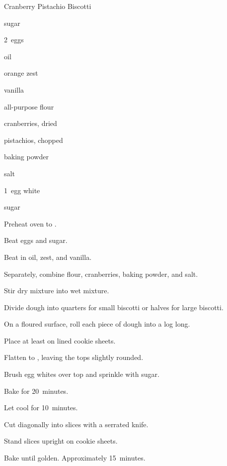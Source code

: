 \begin{recipe}{Cranberry Pistachio Biscotti}{}{}

\begin{ingredients}
\item \C{\threequarter} sugar
\item 2~eggs
\item \C{\quarter} oil
\item \tp{1\half} orange zest
\item \tp{1\half} vanilla
\item {} all-purpose flour
\item \C{\half} cranberries, dried
\item \C{\half} pistachios, chopped
\item {} baking powder
\item \tp{\quarter} salt
\item 1~egg white
\item {} sugar
\end{ingredients}

\begin{directions}
\item Preheat oven to .
\item Beat eggs and \C{\threequarter} sugar.
\item Beat in oil, zest, and vanilla.
\item Separately, combine flour, cranberries, baking powder, and salt.
\item Stir dry mixture into wet mixture.
\item Divide dough into quarters for small biscotti or halves for large biscotti.
\item On a floured surface, roll each piece of dough into a log  long.
\item Place at least  on lined cookie sheets.
\item Flatten to \inch{\threequarter}, leaving the tops slightly rounded.
\item Brush egg whites over top and sprinkle with sugar.
\item Bake for 20~minutes.
\item Let cool for 10~minutes.
\item Cut diagonally into \inch{\half} slices with a serrated knife.
\item Stand slices upright on cookie sheets.
\item Bake until golden. Approximately 15~minutes.
\end{directions}

\end{recipe}
